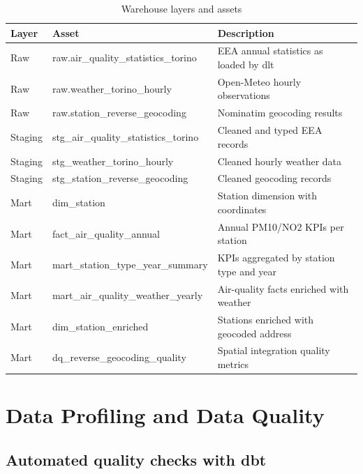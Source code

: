 \documentclass[11pt,a4paper]{article}
\begin{document}
\begin{table}[h!]
\centering
\caption{Warehouse layers and assets}
\small
\begin{tabularx}{\textwidth}{@{}llX@{}}
\toprule
\textbf{Layer} & \textbf{Asset} & \textbf{Description} \\
\midrule
\rowcolor{lightbg}
Raw     & raw.air\_quality\_statistics\_torino & EEA annual statistics as loaded by dlt \\
Raw     & raw.weather\_torino\_hourly          & Open-Meteo hourly observations \\
\rowcolor{lightbg}
Raw     & raw.station\_reverse\_geocoding      & Nominatim geocoding results \\
Staging & stg\_air\_quality\_statistics\_torino & Cleaned and typed EEA records \\
\rowcolor{lightbg}
Staging & stg\_weather\_torino\_hourly         & Cleaned hourly weather data \\
Staging & stg\_station\_reverse\_geocoding     & Cleaned geocoding records \\
\midrule
\rowcolor{lightbg}
Mart    & dim\_station                         & Station dimension with coordinates \\
Mart    & fact\_air\_quality\_annual           & Annual PM10/NO2 KPIs per station \\
\rowcolor{lightbg}
Mart    & mart\_station\_type\_year\_summary   & KPIs aggregated by station type and year \\
Mart    & mart\_air\_quality\_weather\_yearly  & Air-quality facts enriched with weather \\
\rowcolor{lightbg}
Mart    & dim\_station\_enriched               & Stations enriched with geocoded address \\
Mart    & dq\_reverse\_geocoding\_quality      & Spatial integration quality metrics \\
\bottomrule
\end{tabularx}
\end{table}

\section{Data Profiling and Data Quality}

\subsection{Automated quality checks with dbt}
\end{document}
